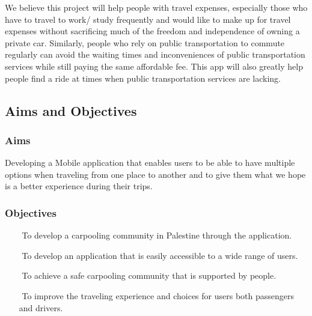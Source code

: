 \documentclass[a4paper, 12pt]{article} %
\begin{document}
        
            We believe this project will help people with travel expenses, especially those who have to travel to work/ study frequently and would like to make up for travel expenses without sacrificing much of the freedom and independence of owning a private car. Similarly, people who rely on public transportation to commute regularly can avoid the waiting times and inconveniences of public transportation services while still paying the same affordable fee. This app will also greatly help people find a ride at times when public transportation services are lacking. 
            
        \subsection{Aims and Objectives}
            \subsubsection{Aims}
                Developing a Mobile application that enables users to be able to have multiple options when traveling from one place to another and to give them what we hope is a better experience during their trips.
                
            \subsubsection{Objectives}
                \begin{itemize}
                    \item [$ $] To develop a carpooling community in Palestine through the application.
                     \item [$ $] To develop an application that is easily accessible to a wide range of users.
                     \item [$ $] To achieve a safe carpooling community that is supported by people.
                     \item [$ $] To improve the traveling experience and choices for users both passengers and drivers.
                \end{itemize}
\end{document}
